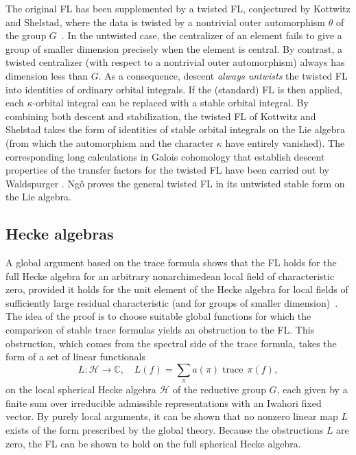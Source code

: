\documentclass[brochure,english,12pt]{bourbaki}
\theoremstyle{plain}
\def\op#1{{\operatorname{#1}}}
\newcommand{\ring}[1]{\mathbb{#1}}
\begin{document}
The original FL has been supplemented by a twisted FL, conjectured by
Kottwitz and Shelstad, where the data is twisted by a nontrivial outer
automorphism $\theta$ of the group $G$~\cite{KS:1999}.  In the
untwisted case, the centralizer of an element fails to give a group of
smaller dimension precisely when the element is central.  By contrast,
a twisted centralizer (with respect to a nontrivial outer
automorphism) always has dimension less than $G$.  As a consequence,
descent {\it always untwists} the twisted FL into identities of
ordinary orbital integrals.  If the (standard) FL is then applied,
each $\kappa$-orbital integral can be replaced with a stable orbital
integral.  By combining both descent and stabilization, the twisted FL
of Kottwitz and Shelstad takes the form of identities of stable
orbital integrals on the Lie algebra (from which the automorphism and
the character $\kappa$ have entirely vanished).  The corresponding
long calculations in Galois cohomology that establish descent
properties of the transfer factors for the twisted FL have been
carried out by Waldspurger \cite{Wald:2008}.  Ng\^o proves the general
twisted FL in its untwisted stable form on the Lie algebra.



\subsection{Hecke algebras}


 A global argument based on
the trace formula shows that the FL holds for the full
Hecke algebra for an arbitrary nonarchimedean local field of
characteristic zero, provided it holds for the unit element of the
Hecke algebra for local fields of sufficiently large residual
characteristic (and for groups of smaller dimension)~\cite{FLSE}.  
The idea of the proof is to choose suitable global
functions for which the comparison of stable trace formulas yields an
obstruction to the FL.  This obstruction, which comes from the
spectral side of the trace formula, takes the form
of a set of linear functionals  
\[
L:{\mathcal H}\to\ring{C},\quad L(f) = \sum_\pi a(\pi) \op{trace}\,\pi(f),
\]
on the local spherical Hecke
algebra ${\mathcal H}$ of the reductive group $G$, each given by a finite sum over
irreducible admissible representations with an Iwahori fixed vector.
By purely local arguments, it
can be shown that no nonzero linear map $L$ exists of the form
prescribed by the global theory.  
Because the obstructions $L$ are zero,
the FL can be shown to hold on the full spherical Hecke algebra.
\end{document}
